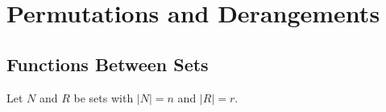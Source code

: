 \documentclass{article}
\begin{document}
\section{Permutations and Derangements}
\begingroup
  \renewcommand{\section}{\subsection}
  
\endgroup


\section{Functions Between Sets}

Let $N$ and $R$ be sets with $|N| = n$ and $|R| = r$.
\end{document}
